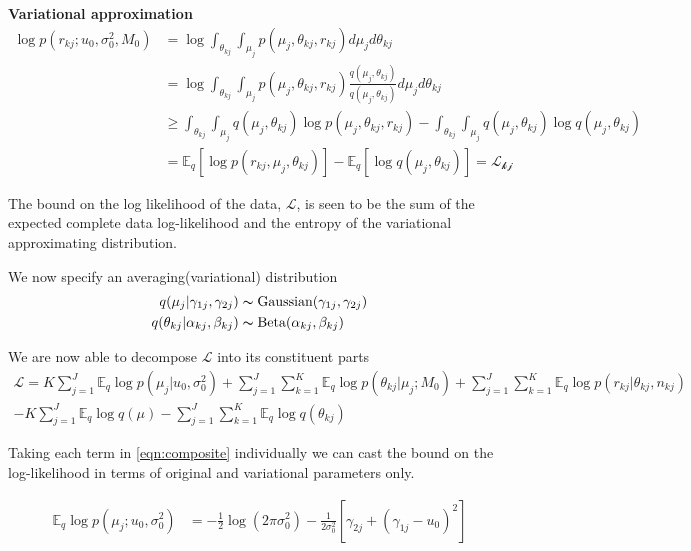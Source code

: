 \documentclass[10pt, letterpaper]{article}
\newcommand{\E}{\mathbb{E}}
\begin{document}
{\bf Variational approximation}
\begin{align}
\log p(r_{kj}; u_0, \sigma_0^2, M_0) & = \log \int_{\theta_{kj}} \int_{\mu_j} p(\mu_j, \theta_{kj}, r_{kj})d\mu_jd\theta_{kj} \\
& = \log \int_{\theta_{kj}} \int_{\mu_j} p(\mu_j, \theta_{kj}, r_{kj}) \frac{q(\mu_j, \theta_{kj})}{q(\mu_j, \theta_{kj})}  d\mu_jd\theta_{kj}\\
& \geq  \int_{\theta_{kj}} \int_{\mu_j} q(\mu_j, \theta_{kj}) \log p(\mu_j, \theta_{kj}, r_{kj}) -  \int_{\theta_{kj}} \int_{\mu_j} q(\mu_j, \theta_{kj}) \log q(\mu_j, \theta_{kj}) \\
& = \E_q \left[ \log p(r_{kj}, \mu_j, \theta_{kj}) \right] - \E_q\left[ \log q(\mu_j, \theta_{kj}) \right] = \mathcal{L_{kj}}
\end{align}

The bound on the log likelihood of the data, $\mathcal{L}$, is seen to be the sum of the expected complete data log-likelihood and the entropy of the variational approximating distribution.

We now specify an averaging(variational) distribution
\begin{align}
q(\mu_j | \gamma_{1j}, \gamma_{2j}) & \thicksim \text{Gaussian}(\gamma_{1j}, \gamma_{2j})\\
q(\theta_{kj} | \alpha_{kj}, \beta_{kj} ) & \thicksim \text{Beta}(\alpha_{kj}, \beta_{kj})
\end{align}

We are now able to decompose $\mathcal{L}$ into its constituent parts
\begin{multline}\label{eqn:composite}
\mathcal{L} = K\sum_{j=1}^J \E_q\log p(\mu_j|u_0,\sigma_0^2) + \sum_{j=1}^J\sum_{k=1}^K\E_q \log p(\theta_{kj} | \mu_j; M_0) 
+ \sum_{j=1}^J\sum_{k=1}^K\E_q \log p(r_{kj} | \theta_{kj}, n_{kj})\\
- K\sum_{j=1}^J\E_q \log q(\mu) - \sum_{j=1}^J\sum_{k=1}^K \E_q \log q(\theta_{kj})
\end{multline}

Taking each term in \eqref{eqn:composite} individually we can cast the bound on the log-likelihood in terms of original and variational parameters only.

\begin{align}
\E_q \log p(\mu_j ; u_0, \sigma_0^2) & = -\frac{1}{2}\log (2\pi\sigma_0^2) -\frac{1}{2\sigma_0^2}\left[ \gamma_{2j} + (\gamma_{1j} - u_0)^2 \right]
\end{align}
\end{document}

